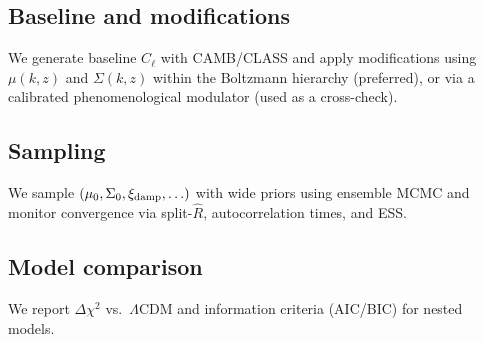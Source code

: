 
\subsection{Baseline and modifications}
We generate baseline $C_\ell$ with CAMB/CLASS and apply modifications using $\mu(k,z)$ and $\Sigma(k,z)$ within the Boltzmann hierarchy (preferred), or via a calibrated phenomenological modulator (used as a cross-check).

\subsection{Sampling}
We sample $(\mu_0,\Sigma_0,\xi_{\rm damp},\ldots)$ with wide priors using ensemble MCMC and monitor convergence via split-$\hat R$, autocorrelation times, and ESS.

\subsection{Model comparison}
We report $\Delta\chi^2$ vs.\ $\Lambda$CDM and information criteria (AIC/BIC) for nested models.

